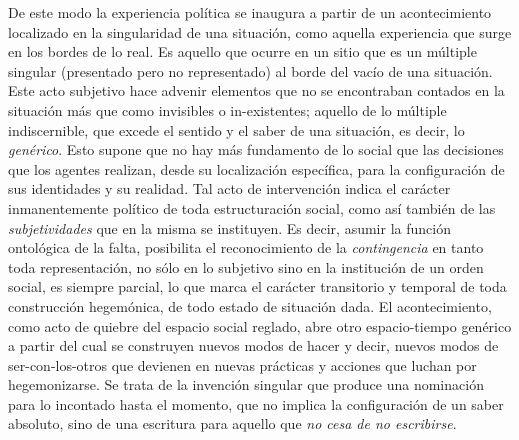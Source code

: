 De este modo la experiencia política se inaugura a partir de un acontecimiento localizado en la singularidad de una situación, como aquella experiencia que surge en los bordes de lo real. Es aquello que ocurre en un sitio que es un múltiple singular (presentado pero no representado) al borde del vacío de una situación. Este acto subjetivo hace advenir elementos que no se encontraban contados en la situación más que como invisibles o in-existentes; aquello de lo múltiple indiscernible, que excede el sentido y el saber de una situación, es decir, lo \emph{genérico}. Esto supone que no hay más fundamento de lo social que las decisiones que los agentes realizan, desde su localización específica, para la configuración de sus identidades y su realidad. Tal acto de intervención indica el carácter inmanentemente político de toda estructuración social, como así también de las \emph{subjetividades} que en la misma se instituyen. Es decir, asumir la función ontológica de la falta, posibilita el reconocimiento de la \emph{contingencia} en tanto toda representación, no sólo en lo subjetivo sino en la institución de un orden social, es siempre parcial, lo que marca el carácter transitorio y temporal de toda construcción hegemónica, de todo estado de situación dada. El acontecimiento, como acto de quiebre del espacio social reglado, abre otro espacio-tiempo genérico a partir del cual se construyen nuevos modos de hacer y decir, nuevos modos de ser-con-los-otros que devienen en nuevas prácticas y acciones que luchan por hegemonizarse. Se trata de la invención singular que produce una nominación para lo incontado hasta el momento, que no implica la configuración de un saber absoluto, sino de una escritura para aquello que \emph{no cesa de no escribirse}.

